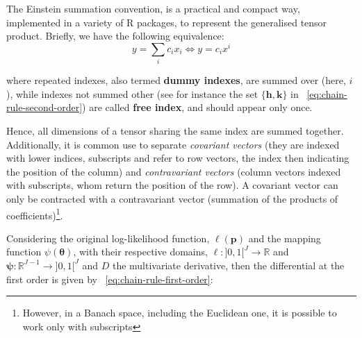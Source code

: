 \documentclass[long, final]{jobim}
\newcommand \RR {\mathbb{R}}
\begin{document}
\begin{definition}
\end{definition}

\begin{definition}
\label{def:einstein-summation}
    The Einstein summation convention, is a practical and compact way, implemented in a variety of R packages, to represent the generalised tensor product. Briefly, we have the following equivalence:
\begin{equation*}
    y = \sum_{i} c_i x_i \Longleftrightarrow y = c_i x^i
\end{equation*}

where repeated indexes, also termed \textbf{dummy indexes}, are summed over (here, $i$), while indexes not summed other (see for instance the set $\{\boldsymbol{h}, \boldsymbol{k}\}$ in \equationname~\ref{eq:chain-rule-second-order}) are called \textbf{free index}, and should appear only once.

Hence, all dimensions of a tensor sharing the same index are summed together. Additionally, it is common use to separate \textit{covariant vectors} (they are indexed with lower indices, subscripts and refer to row vectors, the index then indicating the position of the column) and \textit{contravariant vectors} (column vectors indexed with subscripts, whom return the position of the row).  A covariant vector can only be contracted with a contravariant vector (summation of the products of coefficients)\footnote{However, in a Banach space, including the  Euclidean one,  it is possible to work only with subscripts}.
\end{definition}

Considering the original log-likelihood function, $\ell(\boldsymbol{p})$ and the mapping function $\psi(\boldsymbol{\theta})$, with their respective domains, $\ell: ]0, 1[^J \to \RR$ and $\boldsymbol{\psi}:\RR^{J-1} \to ]0, 1[^J$ and $D$ the multivariate derivative, then the differential at the first order is given by \equationname~\ref{eq:chain-rule-first-order}:
\end{document}

